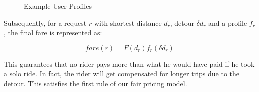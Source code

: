 \begin{figure}
	\centering
	\vspace{-0mm}\caption{Example User Profiles} \vspace{-2mm} \label{fig:profiles}
\end{figure}\vspace{-0mm}

Subsequently, for a request $r$ with shortest distance $d_r$, detour $\delta d_r$ and a profile $f_r$, the final fare is represented as:

\begin{equation}
\label{eq:fare}
fare(r) = F(d_r) f_r(\delta d_r)
\end{equation}

\noindent This guarantees that no rider pays more than what he would have paid if he took a solo ride. In fact, the rider will get compensated for longer trips due to the detour. This satisfies the first rule of our fair pricing model.

